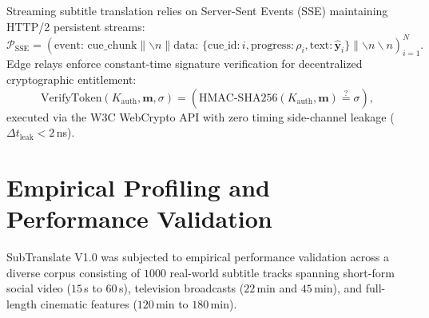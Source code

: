 \documentclass[11pt,a4paper,reqno]{article}
\theoremstyle{definition}
\theoremstyle{remark}
\begin{document}
Streaming subtitle translation relies on Server-Sent Events (SSE) maintaining HTTP/2 persistent streams:
\begin{equation}
\mathcal{P}_{\text{SSE}} = \left( \text{event: cue\_chunk} \parallel \backslash n \parallel \text{data: } \{ \text{cue\_id}: i, \text{progress}: \rho_i, \text{text}: \hat{\mathbf{y}}_i \} \parallel \backslash n \backslash n \right)_{i=1}^N.
\end{equation}
Edge relays enforce constant-time signature verification for decentralized cryptographic entitlement:
\begin{equation}
\mathrm{VerifyToken}(K_{\text{auth}}, \mathbf{m}, \sigma) = \left( \mathrm{HMAC}\text{-}\mathrm{SHA256}(K_{\text{auth}}, \mathbf{m}) \stackrel{?}{=} \sigma \right),
\end{equation}
executed via the W3C WebCrypto API with zero timing side-channel leakage ($\Delta t_{\text{leak}} < 2$\,ns).

\section{Empirical Profiling and Performance Validation}
\label{sec:benchmarks}

SubTranslate V1.0 was subjected to empirical performance validation across a diverse corpus consisting of $1000$ real-world subtitle tracks spanning short-form social video ($15$\,s to $60$\,s), television broadcasts ($22$\,min and $45$\,min), and full-length cinematic features ($120$\,min to $180$\,min).
\end{document}
